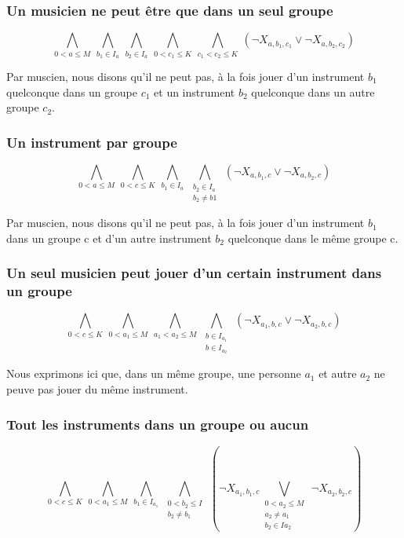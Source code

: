 \documentclass[11pt]{article}
\begin{document}
\subsubsection{Un musicien ne peut être que dans un seul groupe}

$$\bigwedge\limits_{0<a\le M}\ \bigwedge\limits_{b_1\in I_a}\ \bigwedge\limits_{b_2\in I_a}\ \bigwedge\limits_{0<c_1\le K}\ \bigwedge\limits_{c_1<c_2\le K}\ \left(\neg X_{a,b_1,c_1} \vee \neg X_{a,b_2,c_2}\right)$$

Par muscien, nous disons qu'il ne peut pas, à la fois jouer d'un instrument $b_1$ quelconque dans un groupe $c_1$ et un instrument $b_2$ quelconque dans un autre groupe $c_2$.

\subsubsection{Un instrument par groupe}

$$\bigwedge\limits_{0<a\le M}\ \bigwedge\limits_{0<c\le K}\ \bigwedge\limits_{b_1\in I_a}\ \bigwedge\limits_{\substack{b_2\in I_a \\ b_2 \ne b1}}\ \left(\neg X_{a,b_1,c} \vee \neg X_{a,b_2,c}\right)$$

Par muscien, nous disons qu'il ne peut pas, à la fois jouer d'un instrument $b_1$ dans un groupe c et d'un autre instrument $b_2$ quelconque dans le même groupe c.

\subsubsection{Un seul musicien peut jouer d'un certain instrument dans un groupe}

$$\bigwedge\limits_{0<c\le K}\ \bigwedge\limits_{0<a_1\le M}\ \bigwedge\limits_{a_1<a_2\le M}\ \bigwedge\limits_{\substack{b\in I_{a_1} \\ b\in I_{a_2}}}\ \left(\neg X_{a_1,b,c} \vee \neg X_{a_2,b,c}\right)$$

Nous exprimons ici que, dans un même groupe, une personne $a_1$ et autre $a_2$ ne peuve pas jouer du même instrument.

\subsubsection{Tout les instruments dans un groupe ou aucun}

$$\bigwedge\limits_{0<c\le K}\ \bigwedge\limits_{0<a_1\le M}\ \bigwedge\limits_{b_1\in I_{a_1}}\ \bigwedge\limits_{\substack{0<b_2\le I \\ b_2 \ne b_1}}\ \left(\neg X_{a_1,b_1,c} \bigvee\limits_{\substack{0<a_2\le M \\ a_2 \ne a_1 \\ b_2 \in I{a_2}}}\ \neg X_{a_2,b_2,c}\right)$$
\end{document}
